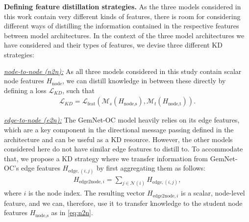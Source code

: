 \documentclass{article}
\newcommand{\loss}{\mathcal{L}}
\begin{document}
\textbf{Defining feature distillation strategies.} 
As the three models considered in this work contain very different kinds of features, there is room for considering different ways of distilling the information contained in the respective features between model architectures. In the context of the three model architectures we have considered and their types of features, we devise three different KD strategies: 

\underline{\emph{node-to-node (n2n):}} As all three models considered in this study contain scalar node features $H_{\text{node}}$, we can distill knowledge in between these directly by defining a loss $\loss_{KD}$, such that
\begin{align}
\label{eq:n2n}
    \loss_{KD} = \loss_{\text{feat}} (\mathcal{M}_{s}(H_{\text{node}, \text{s}}), \mathcal{M}_{t}(H_{\text{node},\text{t}})).
\end{align}

\underline{\emph{edge-to-node (e2n):}} The GemNet-OC model heavily relies on its edge features, which are a key component in the directional message passing defined in the architecture and can be useful as a KD resource. However, the other models considered here do not have similar edge features to distill to. To accommodate that, we propose a KD strategy where we transfer information from GemNet-OC's edge features $H_{\text{edge}, (i,j)}$ by first aggregating them as follows:
\begin{align}
    H_{\text{edge2node}, i} = \sum_{j\in\mathcal{N}(i)} H_{\text{edge}, (i,j)},
\end{align}
where $i$ is the node index. The resulting vector $H_{\text{edge2node}, i}$ is a scalar, node-level feature, and we can, therefore, use it to transfer knowledge to the student node features $H_{\text{node}, \text{s}}$ as in \cref{eq:n2n}.
\end{document}
